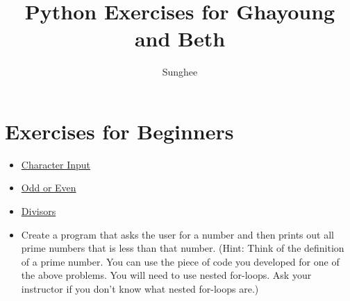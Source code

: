 \documentclass{article}
\title{Python Exercises for Ghayoung and Beth}
\author{Sunghee}
\begin{document}
\maketitle

\section{Exercises for Beginners}

\begin{itemize}
\item \href{https://www.practicepython.org/exercise/2014/01/29/01-character-input.html}{Character Input}

\item \href{https://www.practicepython.org/exercise/2014/02/05/02-odd-or-even.html}{Odd or Even}

\item \href{https://www.practicepython.org/exercise/2014/02/26/04-divisors.html}{Divisors}

\item Create a program that asks the user for a number and then prints out all prime numbers that is less than that number.
(Hint: Think of the definition of a prime number. You can use the piece of code you developed for one of the above problems.
You will need to use nested for-loops. Ask your instructor if you don't know what nested for-loops are.)

\end{itemize}
\end{document}
